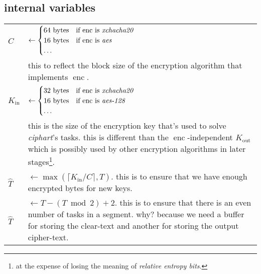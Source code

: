 \documentclass[twocolumn]{article}
\DeclareMathOperator{\enc}{enc}
\DeclareMathOperator{\maxf}{max}
\begin{document}
\subsection{internal variables}
\begin{tabularx}{\columnwidth}{lX}
    $C$         & $\gets \begin{cases}
                        64 \text{ bytes} & \text{if $\enc$ is
                                            \emph{xchacha20}}\\
                        16 \text{ bytes} & \text{if $\enc$ is \emph{aes}}\\
                        \ldots & \\
                     \end{cases}$\\
                & this to reflect the block size of the encryption
                    algorithm that implements $\enc$.\\
    $K_{\text{in}}$ & $\gets \begin{cases}
                        32 \text{ bytes} & \text{if $\enc$ is
                                            \emph{xchacha20}}\\
                        16 \text{ bytes} & \text{if $\enc$ is
                            \emph{aes-128}}\\
                        \ldots & \\
                     \end{cases}$\\
                & this is the size of the encryption key that's used to
                    solve \emph{ciphart}'s tasks.  this is different than
                    the $\enc$-independent $K_{\text{out}}$ which is
                    possibly used by other encryption algorithms in later
                    stages\footnote{at the expense of losing the meaning of
                    \emph{relative entropy bits}.}.\\
    $\hat T$    & $\gets \maxf(\lceil K_{\text{in}} / C\rceil, T)$.  this
                    is to ensure that we have enough encrypted bytes for
                    new keys.\\
    $\hat T$    & $\gets T - (T \bmod 2) + 2$.  this is to ensure that
                    there is an even number of tasks in a segment.  why?
                    because we need a buffer for storing the clear-text and
                    another for storing the output cipher-text.\\
\end{tabularx}
\end{document}
